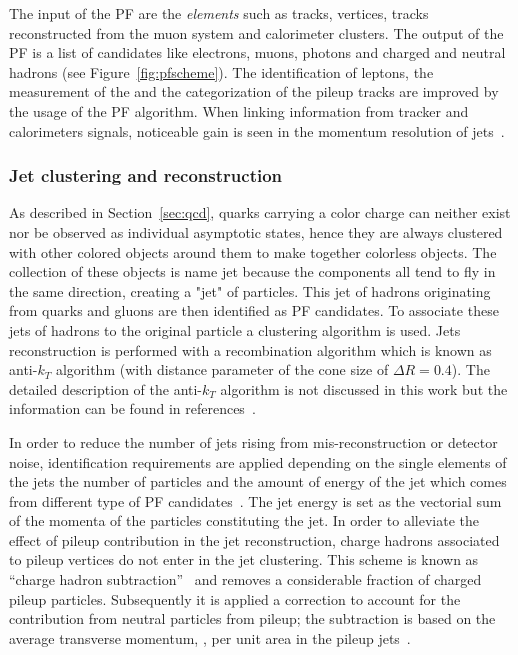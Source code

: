 The input of the PF are the \emph{elements} such as tracks, vertices, tracks
reconstructed from the muon system and
calorimeter clusters. The output of the PF is a list of candidates
like electrons, muons, photons and charged and neutral hadrons (see
Figure~\ref{fig:pfscheme}). The identification of leptons, the
measurement of the \ptmiss and the categorization of the pileup tracks
are improved by the usage of the PF algorithm. When linking
information from tracker and calorimeters signals, noticeable gain is seen
in the momentum resolution of jets~\cite{CMS:particleflow}.

\subsubsection{Jet clustering and
  reconstruction}\label{sec:jetclustering}
As described in Section~\ref{sec:qcd}, quarks carrying a color
charge can neither exist nor be observed as individual asymptotic
states, hence they are always clustered with other colored objects around them
to make together colorless objects. The collection of these objects is name 
jet because the components all tend to fly in the same direction,
creating a "jet" of particles. This jet of hadrons originating from
quarks and gluons are then identified as PF candidates. 
To associate these jets of hadrons to the original particle a clustering algorithm is used.
Jets reconstruction is performed with a recombination algorithm which
is known as anti-$k_T$ algorithm (with distance parameter of the cone size
of $\Delta R = 0.4$). The detailed description of the anti-$k_T$ algorithm is not
discussed in this work but the information can be found in 
references~\cite{Cacciari_2008,Cacciari_2012}.

In order to reduce the number of jets rising from mis-reconstruction or
detector noise, identification requirements are applied depending on the single elements of the
jets \ie the number of particles and the amount of energy of the
jet which comes from different type of PF candidates~\cite{CMS-PAS-JME-16-003}.
The jet energy is set as the vectorial sum of the momenta of the
particles constituting the jet. In order to alleviate the effect of
pileup contribution in the jet reconstruction, charge hadrons
associated to pileup vertices do not enter in the jet clustering. This
scheme is known as ``charge hadron
subtraction''~\cite{CMS-PAS-JME-14-001} and removes a
considerable fraction of charged pileup particles.  
Subsequently it is applied a correction to account for the
contribution from neutral particles from pileup; the subtraction is
based on the average transverse momentum, \pt, per unit area in the
pileup jets~\cite{CACCIARI2008119, Cacciari_2008_area,
  Sirunyan:2020foa}.


